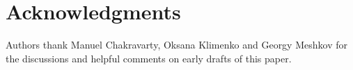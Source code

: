 \documentclass[runningheads]{llncs}
\begin{document}






    \section*{Acknowledgments}

    Authors thank Manuel Chakravarty, Oksana Klimenko and Georgy Meshkov for
    the discussions and helpful comments on early drafts of this paper.

    
\end{document}
